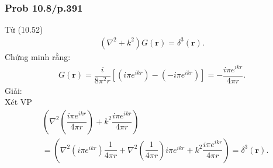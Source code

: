 \documentclass{report}
\newcommand{\f}[2]{\dfrac{#1}{#2}}
\begin{document}
\subsubsection{Prob 10.8/p.391}
Từ (10.52)
\begin{align*}
	\left( \nabla^2 + k^2 \right)G(\mathbf{r}) = \delta^3(\mathbf{r}).
\end{align*}
Chứng minh rằng:
\begin{align*}
	G(\mathbf{r}) = \f{i}{8\pi^2 r} \left[ \left( i\pi e^{ikr} \right) - \left( -i\pi e^{ikr} \right) \right] = -\f{i\pi e^{ikr}}{4\pi r}.
\end{align*}
Giải:\\
Xét VP
\begin{align*}
	 & \left( \nabla^2\left(\f{i\pi e^{ikr}}{4\pi r}\right) + k^2 \f{i\pi e^{ikr}}{4\pi r}\right)                                                                              \\
	 & =\left( \nabla^2\left(i\pi e^{ikr}\right)\f{1}{4\pi r} + \nabla^2\left(\f{1}{4\pi r}\right)i\pi e^{ikr} + k^2 \f{i\pi e^{ikr}}{4\pi r}\right) = \delta^{3}(\mathbf{r}).
\end{align*}
\end{document}
